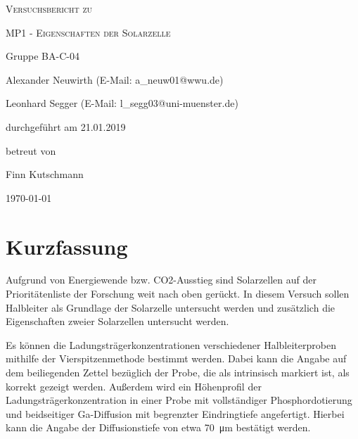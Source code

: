 \documentclass[
	a4paper,
	12pt,
	pagesize,
	ngerman
]{scrartcl}
\begin{document}
	\begin{titlepage}
		\centering
		{\scshape\LARGE Versuchsbericht zu \par}
		\vspace{1cm}
		{\scshape\huge MP1 - Eigenschaften der Solarzelle \par}
		\vspace{2.5cm}
		{\LARGE Gruppe BA-C-04 \par}
		\vspace{0.5cm}

		{\large Alexander Neuwirth (E-Mail: a\_neuw01@wwu.de) \par}
		{\large Leonhard Segger (E-Mail: l\_segg03@uni-muenster.de) \par}
		\vfill

		durchgeführt am 21.01.2019\par
		betreut von\par
		{\large Finn Kutschmann}

		\vfill

		{\large \today\par}
	\end{titlepage}
	\tableofcontents
	\newpage


	\section{Kurzfassung}
	Aufgrund von Energiewende bzw. CO2-Ausstieg sind Solarzellen auf der Prioritätenliste der Forschung weit nach oben gerückt.
	In diesem Versuch sollen Halbleiter als Grundlage der Solarzelle untersucht werden und zusätzlich die Eigenschaften zweier Solarzellen untersucht werden.

	Es können die Ladungsträgerkonzentrationen verschiedener Halbleiterproben mithilfe der Vierspitzenmethode bestimmt werden.
	Dabei kann die Angabe auf dem beiliegenden Zettel bezüglich der Probe, die als intrinsisch markiert ist, als korrekt gezeigt werden.
	Außerdem wird ein Höhenprofil der Ladungsträgerkonzentration in einer Probe mit vollständiger Phosphordotierung und beidseitiger Ga-Diffusion mit begrenzter Eindringtiefe angefertigt.
	Hierbei kann die Angabe der Diffusionstiefe von etwa \SI{70}{\micro \meter} bestätigt werden.
\end{document}
